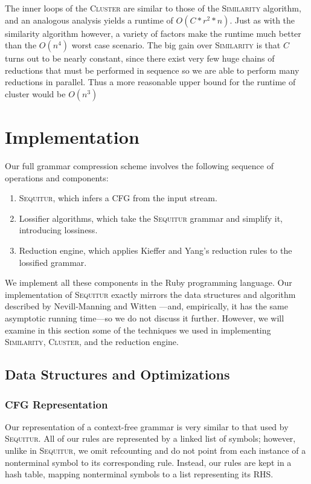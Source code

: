 \documentclass[11pt]{article}
\newcommand{\Sequitur}{\textsc{Sequitur}\xspace}
\newcommand{\Similarity}{\textsc{Similarity}\xspace}
\newcommand{\Cluster}{\textsc{Cluster}\xspace}
\begin{document}
The inner loops of the \Cluster are similar to those of the \Similarity
algorithm, and an analogous analysis yields a runtime of $\boxed{O(C*r^2*n)}$.
Just as with the similarity algorithm however, a variety of factors make the
runtime much better than the $\boxed{O(n^4)}$ worst case scenario.  The big
gain over \Similarity is that $C$ turns out to be nearly constant, since there
exist very few huge chains of reductions that must be performed in sequence so
we are able to perform many reductions in parallel.  Thus a more reasonable
upper bound for the runtime of cluster would be $\boxed{O(n^3)}$

\section{Implementation}

Our full grammar compression scheme involves the following sequence of
operations and components:
\begin{enumerate}
  \item \Sequitur, which infers a CFG from the input stream.
  \item Lossifier algorithms, which take the \Sequitur grammar and simplify it,
    introducing lossiness.
  \item Reduction engine, which applies Kieffer and Yang's reduction rules to
    the lossified grammar.
\end{enumerate}

We implement all these components in the Ruby programming language.  Our
implementation of \Sequitur exactly mirrors the data structures and algorithm
described by Nevill-Manning and Witten \cite{sequitur}---and, empirically, it
has the same asymptotic running time---so we do not discuss it further.
However, we will examine in this section some of the techniques we used in
implementing \Similarity, \Cluster, and the reduction engine.

\subsection{Data Structures and Optimizations}

\subsubsection{CFG Representation}

Our representation of a context-free grammar is very similar to that used by
\Sequitur.  All of our rules are represented by a linked list of symbols;
however, unlike in \Sequitur, we omit refcounting and do not point from each
instance of a nonterminal symbol to its corresponding rule.  Instead, our rules
are kept in a hash table, mapping nonterminal symbols to a list representing
its RHS.
\end{document}
